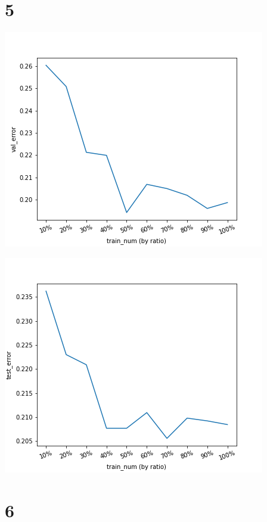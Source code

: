\documentclass{article}
\begin{document}
\newpage

\section*{5}

\includegraphics[width=\textwidth]{./images/C5_val_error_vs_train_num.png}

\includegraphics[width=\textwidth]{./images/C5_test_error_vs_train_num.png}

\section*{6}
\end{document}
